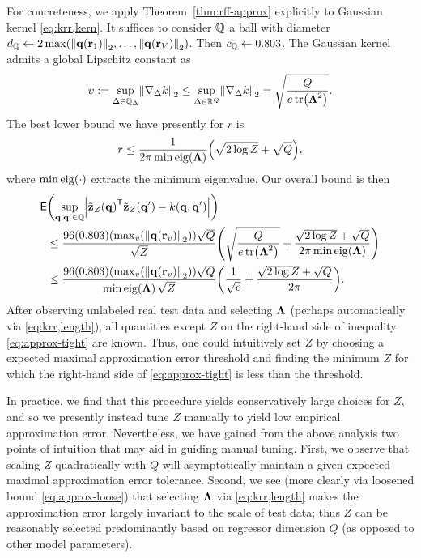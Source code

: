 For concreteness,
we apply Theorem~\ref{thm:rff-approx} explicitly 
to Gaussian kernel \eqref{eq:krr,kern}.
It suffices to consider $\mathbb{Q}$ a ball
with diameter 
$d_\setQ \gets 2 
\max\paren{\norm{\bmq\paren{\bmr_1}}_2,\dots,\norm{\bmq\paren{\bmr_V}}_2}$.
Then $c_{\mathbb{Q}} \gets 0.803$.
The Gaussian kernel admits a global Lipschitz constant as
\begin{align}
	\upsilon := \sup_{\Delta \in \setQD} \norm{\grada{\Delta}{k}}_2 
		\leq \sup_{\Delta \in \reals{Q}} \norm{\grada{\Delta}{k}}_2 
		= \sqrt{\frac{Q}{e\trace{\bmL^2}}}.
	\label{eq:krr,lipschitz}
\end{align}
The best lower bound we have presently 
for $r$ is 
\begin{align}
	r \leq \frac{1}{2\pi \mineig{\bmL}} \paren{\sqrt{2 \log{Z}} + \sqrt{Q}},
	\label{eq:krr,max-nu}
\end{align}
where $\mineig{\cdot}$ extracts the minimum eigenvalue.
Our overall bound is then 
\begin{align}
	\mathsf{E}&\paren{\sup_{\bmq,\bmq' \in \setQ} 
		\abs{\bmztZa{\bmq}\tpose\bmztZa{\bmq'}-k\paren{\bmq,\bmq'}}} 
		\nonumber \\
	&\leq 
		\frac{96\paren{0.803}
		\paren{\max_v\paren{\norm{\bmq\paren{\bmr_v}}_2}}\sqrt{Q}}{\sqrt{Z}}
		\paren{\sqrt{\frac{Q}{e\trace{\bmL^2}}} + 
		\frac{\sqrt{2 \log{Z}} + \sqrt{Q}}{2\pi \mineig{\bmL}}}
		\label{eq:approx-tight} \\
	&\leq 
		\frac{96\paren{0.803}
		\paren{\max_v\paren{\norm{\bmq\paren{\bmr_v}}_2}}\sqrt{Q}}{\mineig{\bmL}\sqrt{Z}}
		\paren{\frac{1}{\sqrt{e}} + \frac{\sqrt{2\log{Z}} + \sqrt{Q}}{2\pi}}.
		\label{eq:approx-loose}
\end{align}	
After observing unlabeled real test data 
and selecting $\boldsymbol{\Lambda}$ 
(perhaps automatically via \eqref{eq:krr,length}),
all quantities except $Z$ 
on the right-hand side 
of inequality \eqref{eq:approx-tight}
are known.
Thus,
one could intuitively set $Z$
by choosing a expected maximal approximation error threshold
and finding the minimum $Z$ 
for which the right-hand side of \eqref{eq:approx-tight}
is less than the threshold.

In practice, we find 
that this procedure 
yields conservatively large choices for $Z$,
and so we presently instead tune $Z$ manually
to yield low empirical approximation error.
Nevertheless,
we have gained 
from the above analysis 
two points of intuition
that may aid in guiding manual tuning.
First,
we observe 
that scaling $Z$ quadratically with $Q$ 
will asymptotically maintain 
a given expected maximal approximation error tolerance.
Second, we see
(more clearly via loosened bound \eqref{eq:approx-loose})
that selecting $\boldsymbol{\Lambda}$
via \eqref{eq:krr,length}
makes the approximation error largely invariant
to the scale of test data;
thus $Z$ can be reasonably selected
predominantly based on regressor dimension $Q$
(as opposed to other model parameters).

